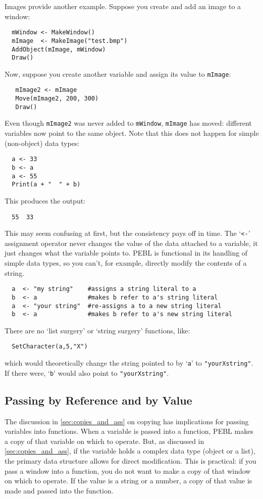 Images provide another example. Suppose you create and add an image to a window:
\begin{verbatim}
  mWindow <- MakeWindow()
  mImage  <- MakeImage("test.bmp")
  AddObject(mImage, mWindow)
  Draw()
\end{verbatim}
Now, suppose you create another variable and assign its
value to \texttt{mImage}:
\begin{verbatim}
   mImage2 <- mImage
   Move(mImage2, 200, 300)
   Draw()
\end{verbatim}
Even though \texttt{mImage2} was never added to \texttt{mWindow}, \texttt{mImage}
has moved: different variables now point to the same object. Note that this does not happen for simple (non-object) data types:
\begin{verbatim}
  a <- 33
  b <- a
  a <- 55
  Print(a + "  " + b)
\end{verbatim}
This produces the output:
\begin{verbatim}
  55  33
\end{verbatim} 
This may seem confusing at first, but the consistency pays off in
time.  The `\verb+<-+' assignment operator never changes the value of
the data attached to a variable, it just changes what the variable
points to.  PEBL is functional in its handling of simple data types,
so you can't, for example, directly modify the contents of a string.
\begin{verbatim}
  a  <- "my string"    #assigns a string literal to a
  b  <- a              #makes b refer to a's string literal
  a  <- "your string"  #re-assigns a to a new string literal
  b  <- a              #makes b refer to a's new string literal
\end{verbatim}
There are no `list surgery' or `string surgery' functions, like: 
\begin{verbatim}
  SetCharacter(a,5,"X")
\end{verbatim}
which would theoretically change the string pointed to by `\texttt{a}' to 
\texttt{"yourXstring"}.  If there were, `\texttt{b}' would also point to \texttt{"yourXstring"}.

\subsection{Passing by Reference and by Value}

The discussion in \ref{sec:copies_and_ass} on copying has implications for passing
variables into functions.  When a variable is passed into a function, PEBL makes a copy of that variable on which to operate. But, as discussed in \ref{sec:copies_and_ass}, if the variable holds a complex data
type (object or a list), the primary data structure allows for direct modification.  This is practical: if you pass a
window into a function, you do not want to make a copy of
that window on which to operate.  If the value is a string or a
number, a copy of that value is made and passed into the function.
  

